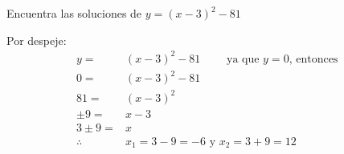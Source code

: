 Encuentra las soluciones de $y=(x-3)^2-81$

\begin{solutionbox}{5cm}
    Por despeje:
    \begin{align*}
        y=         & (x-3)^2-81 \qquad \text{ ya que $y=0$, entonces } \\
        0=         & (x-3)^2-81                                        \\
        81=        & (x-3)^2                                           \\
        \pm 9=     & x-3                                               \\
        3 \pm 9=   & x                                                 \\
        \therefore & x_1=3-9 =-6 \text{ y } x_2=3+9=12
    \end{align*}
\end{solutionbox}

